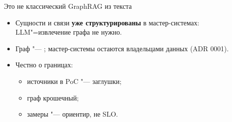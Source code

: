 \begin{frame}{Это не классический GraphRAG из текста}
  \begin{itemize}
    \item Сущности и связи \textbf{уже структурированы} в мастер-системах: LLM"=извлечение графа не нужно.
    \item Граф "--- ; мастер-системы остаются владельцами данных (ADR 0001).
    \item Честно о границах:
      \begin{itemize}
        \item источники в PoC "--- заглушки;
        \item граф крошечный;
        \item замеры "--- ориентир, не SLO.
      \end{itemize}
  \end{itemize}
\end{frame}
